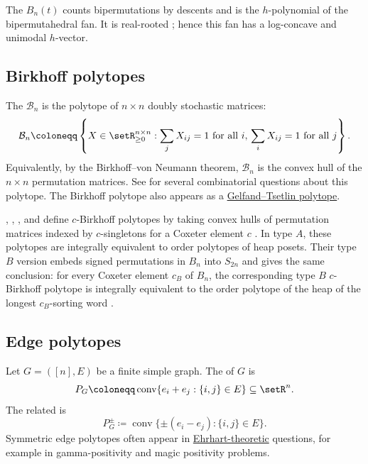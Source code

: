 The \label{biEulerianPolynomial} $B_n(t)$
counts bipermutations by descents and is the $h$-polynomial of the
bipermutahedral fan.  It is real-rooted
\cite[Thm.~6.3]{Ardila2022Bipermutahedron}; hence this fan has a log-concave
and unimodal $h$-vector.


\subsection[birkhoffPolytope]{Birkhoff polytopes}

The \label{birkhoffPolytopeDefinition}
$\mathcal{B}_n$ is the polytope of
$n\times n$ doubly stochastic matrices:
\[
  \mathcal{B}_n
  \coloneqq
  \left\{
    X\in\setR_{\geq 0}^{n\times n} :
    \sum_j X_{ij}=1 \text{ for all } i,\,
    \sum_i X_{ij}=1 \text{ for all } j
  \right\}.
\]
Equivalently, by the Birkhoff--von Neumann theorem, $\mathcal{B}_n$ is
the convex hull of the $n\times n$ permutation matrices.  See
\cite{Pak2000} for several combinatorial questions about this polytope.
The Birkhoff polytope also appears as a
\hyperref[birkhoffPolytopeAsGelfandTsetlin]{Gelfand--Tsetlin polytope}.

, , , and
 define $c$-Birkhoff polytopes by taking convex hulls of
permutation matrices indexed by $c$-singletons for a Coxeter element $c$
\cite{BanaianChepuriGunawanPan2025x}.  In type $A$, these polytopes are
integrally equivalent to order polytopes of heap posets.  Their type $B$
version embeds signed permutations in $B_n$ into $S_{2n}$ and gives the
same conclusion: for every Coxeter element $c_B$ of $B_n$, the corresponding
type $B$ $c$-Birkhoff polytope is integrally equivalent to the order
polytope of the heap of the longest $c_B$-sorting word
\cite[Thm.~3.16]{BanaianChepuriGunawanPan2026x}.


\subsection[edgePolytope]{Edge polytopes}

Let $G=([n],E)$ be a finite simple graph.  The
\label{edgePolytopeDefinition} of $G$ is
\[
  P_G \coloneqq \operatorname{conv}\{e_i+e_j : \{i,j\}\in E\}
  \subseteq \setR^n.
\]
The related \label{symmetricEdgePolytope} is
\[
  P_G^{\pm} \coloneqq
  \operatorname{conv}\{\pm(e_i-e_j): \{i,j\}\in E\}.
\]
Symmetric edge polytopes often appear in
\hyperref[ehrhart]{Ehrhart-theoretic} questions, for
example in gamma-positivity and magic positivity problems.

